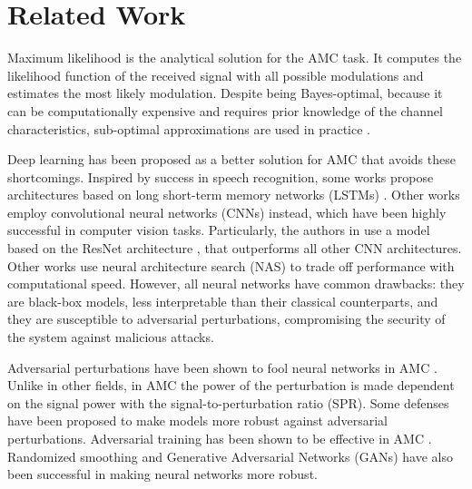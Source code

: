 \documentclass[conference]{IEEEtran}
\begin{document}
\section{Related Work}

Maximum likelihood \cite{huan1995likelihood,dobre2007survey,hameed2009likelihood} is the analytical solution for the AMC task. It computes the likelihood function of the received signal with all possible modulations and estimates the most likely modulation. Despite being Bayes-optimal, because it can be computationally expensive and requires prior knowledge of the channel characteristics, sub-optimal approximations are used in practice \cite{dobre2007survey,Hameed_Dobre_Popescu_2009}.

Deep learning \cite{goodfellow2016deep} has been proposed as a better solution for AMC that avoids these shortcomings. Inspired by success in speech recognition, some works \cite{Rajendran_Meert_Giustiniano_Lenders_Pollin_2018,Guo_Jiang_Wu_Zhou_2020} propose architectures based on long short-term memory networks (LSTMs) \cite{Hochreiter_Schmidhuber_1997}. Other works \cite{OShea_Corgan_Clancy_2016,West_OShea_2017,Sadeghi_Larsson_2019} employ convolutional neural networks (CNNs) \cite{Krizhevsky_Sutskever_Hinton_2017} instead, which have been highly successful in computer vision tasks. Particularly, the authors in \cite{OShea_Roy_Clancy_2018} use a model based on the ResNet architecture \cite{Szegedy_Ioffe_Vanhoucke_Alemi_2016}, that outperforms all other CNN architectures. Other works use neural architecture search (NAS) \cite{ahmadi2008modulation,dai2019multi,perenda2021evolutionary} to trade off performance with computational speed. However, all neural networks have common drawbacks: they are black-box models, less interpretable than their classical counterparts, and they are susceptible to adversarial perturbations, compromising the security of the system against malicious attacks.

Adversarial perturbations have been shown to fool neural networks in AMC \cite{Sadeghi_Larsson_2019,maroto2021benefits}. Unlike in other fields, in AMC the power of the perturbation is made dependent on the signal power with the signal-to-perturbation ratio (SPR). Some defenses have been proposed to make models more robust against adversarial perturbations. Adversarial training \cite{Madry_Makelov_Schmidt_Tsipras_Vladu_2019} has been shown to be effective in AMC \cite{maroto2021safeamc,manoj2022toward}. Randomized smoothing \cite{kim2021channel,manoj2022toward} and Generative Adversarial Networks (GANs) \cite{wang2022gan} have also been successful in making neural networks more robust.
\end{document}
